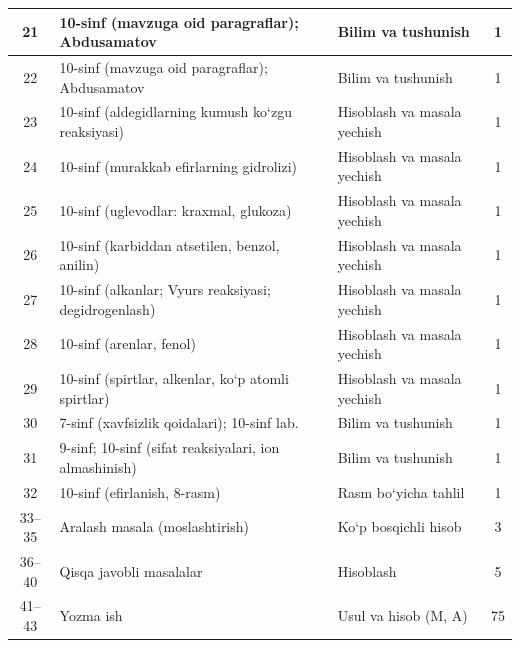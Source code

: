 \documentclass[11pt,a4paper]{article}
\begin{document}
{\begin{longtable}{|c|p{7.2cm}|p{5.4cm}|c|}
21 & 10-sinf (mavzuga oid paragraflar); Abdusamatov & Bilim va tushunish & 1\\\hline
22 & 10-sinf (mavzuga oid paragraflar); Abdusamatov & Bilim va tushunish & 1\\\hline
23 & 10-sinf (aldegidlarning kumush ko`zgu reaksiyasi) & Hisoblash va masala yechish & 1\\\hline
24 & 10-sinf (murakkab efirlarning gidrolizi) & Hisoblash va masala yechish & 1\\\hline
25 & 10-sinf (uglevodlar: kraxmal, glukoza) & Hisoblash va masala yechish & 1\\\hline
26 & 10-sinf (karbiddan atsetilen, benzol, anilin) & Hisoblash va masala yechish & 1\\\hline
27 & 10-sinf (alkanlar; Vyurs reaksiyasi; degidrogenlash) & Hisoblash va masala yechish & 1\\\hline
28 & 10-sinf (arenlar, fenol) & Hisoblash va masala yechish & 1\\\hline
29 & 10-sinf (spirtlar, alkenlar, ko`p atomli spirtlar) & Hisoblash va masala yechish & 1\\\hline
30 & 7-sinf (xavfsizlik qoidalari); 10-sinf lab. & Bilim va tushunish & 1\\\hline
31 & 9-sinf; 10-sinf (sifat reaksiyalari, ion almashinish) & Bilim va tushunish & 1\\\hline
32 & 10-sinf (efirlanish, 8-rasm) & Rasm bo`yicha tahlil & 1\\\hline
33--35 & Aralash masala (moslashtirish) & Ko`p bosqichli hisob & 3\\\hline
36--40 & Qisqa javobli masalalar & Hisoblash & 5\\\hline
41--43 & Yozma ish & Usul va hisob (M, A) & 75\\\hline
\end{longtable}}
\end{document}
